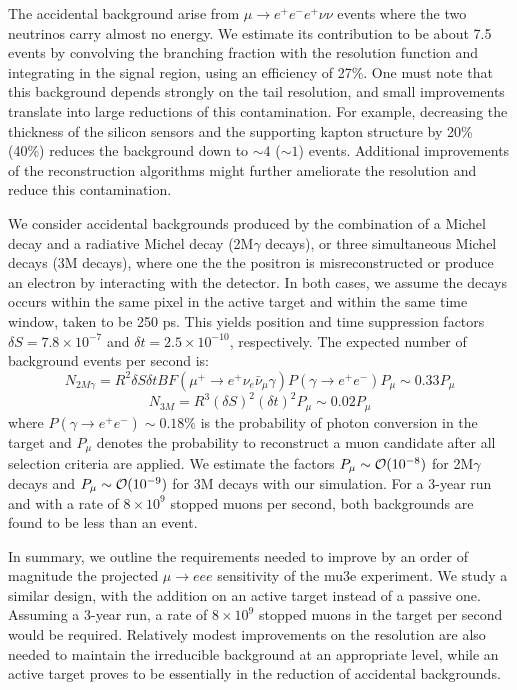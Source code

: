The accidental background arise from $\mu \rightarrow e^+e^-e^+ \nu\nu$ events where the two neutrinos carry almost no energy. We estimate its contribution to be about 7.5 events by convolving the branching fraction with the resolution function and integrating in the signal region, using an efficiency of 27\%. One must note that this background depends strongly on the tail resolution, and small improvements translate into large reductions of this contamination. For example, decreasing the thickness of the silicon sensors and the supporting kapton structure by 20\% (40\%) reduces the background down to $\sim 4$ ($\sim 1$) events. Additional improvements of the reconstruction algorithms might further ameliorate the resolution and reduce this contamination.

We consider accidental backgrounds produced by the combination of a Michel decay and a radiative Michel decay (2M$\gamma$ decays), or three simultaneous Michel decays (3M decays), where one the the positron is misreconstructed or produce an electron by interacting with the detector. In both cases, we assume 
the decays occurs within the same pixel in the active target and within the same time window, taken to be 250 ps. This yields position and time suppression factors $\delta S = 7.8\times 10^{-7}$ and $\delta t = 2.5\times 10^{-10}$, respectively. The expected number of background events per second is:
%
$$N_{2M\gamma} = R^2 \delta S \delta t BF(\mu^+ \rightarrow e^+ \nu_e \bar\nu_\mu \gamma) P(\gamma \rightarrow e^+ e^-)  P_\mu  \sim 0.33 P_\mu$$
$$N_{3M} = R^3(\delta S)^2 (\delta t)^2 P_\mu \sim 0.02 P_\mu$$
%
where $P(\gamma \rightarrow e^+ e^-)\sim 0.18\%$ is the probability of photon conversion in the target and $P_\mu$ denotes the probability to reconstruct a muon candidate after all selection criteria are applied. We estimate the factors $P_\mu \sim {\cal O}(10^{-8})$ for 2M$\gamma$ decays and $P_\mu \sim {\cal O}(10^{-9})$ for 3M decays with our simulation. For a 3-year run and with a rate of $8\times 10^{9}$ stopped muons per second, both backgrounds are found to be less than an event.

In summary, we outline the requirements needed to improve by an order of magnitude the projected $\mu \rightarrow eee$ 
sensitivity of the mu3e experiment. We study a similar design, with the addition on an active target instead of a passive one. Assuming a 3-year run, a rate of $8\times 10^{9}$ stopped muons in the target per second would be required. Relatively modest improvements on the resolution are also needed to maintain the irreducible background at an appropriate level, while an active target proves to be essentially in the reduction of accidental 
backgrounds. 


